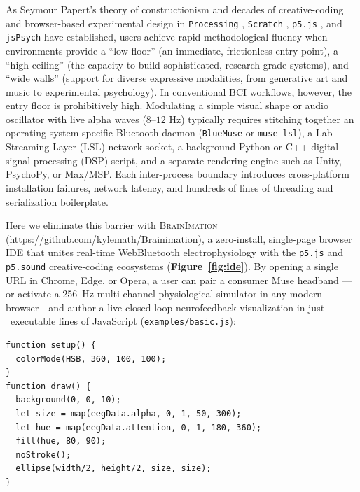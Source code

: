 \documentclass[10pt,twocolumn]{article}
\begin{document}
As Seymour Papert's theory of constructionism \citep{papert1980mindstorms} and decades of creative-coding and browser-based experimental design in \texttt{Processing} \citep{reas2007processing}, \texttt{Scratch} \citep{resnick2009scratch}, \texttt{p5.js} \citep{mccarthy2015p5}, and \texttt{jsPsych} \citep{deleeuw2015jspsych} have established, users achieve rapid methodological fluency when environments provide a ``low floor'' (an immediate, frictionless entry point), a ``high ceiling'' (the capacity to build sophisticated, research-grade systems), and ``wide walls'' (support for diverse expressive modalities, from generative art and music to experimental psychology). In conventional BCI workflows, however, the entry floor is prohibitively high. Modulating a simple visual shape or audio oscillator with live alpha waves ($8\text{--}12\text{ Hz}$) typically requires stitching together an operating-system-specific Bluetooth daemon (\texttt{BlueMuse} or \texttt{muse-lsl}), a Lab Streaming Layer (LSL) network socket, a background Python or C++ digital signal processing (DSP) script, and a separate rendering engine such as Unity, PsychoPy, or Max/MSP. Each inter-process boundary introduces cross-platform installation failures, network latency, and hundreds of lines of threading and serialization boilerplate.

Here we eliminate this barrier with \textsc{BrainImation} (\url{https://github.com/kylemath/Brainimation}), a zero-install, single-page browser IDE that unites real-time WebBluetooth electrophysiology with the \texttt{p5.js} and \texttt{p5.sound} creative-coding ecosystems \citep{mccarthy2015p5} (\textbf{Figure~\ref{fig:ide}}). By opening a single URL in Chrome, Edge, or Opera, a user can pair a consumer Muse headband \citep{krigolson2017choosing,kuziek2017transitioning,kuziek2018increasing}---or activate a 256~Hz multi-channel physiological simulator in any modern browser---and author a live closed-loop neurofeedback visualization in just \ExLOCMin~executable lines of JavaScript (\texttt{examples/basic.js}):

\noindent\begin{minipage}{\columnwidth}
\begin{lstlisting}
function setup() {
  colorMode(HSB, 360, 100, 100);
}
function draw() {
  background(0, 0, 10);
  let size = map(eegData.alpha, 0, 1, 50, 300);
  let hue = map(eegData.attention, 0, 1, 180, 360);
  fill(hue, 80, 90);
  noStroke();
  ellipse(width/2, height/2, size, size);
}
\end{lstlisting}
\end{minipage}
\vspace{4pt}
\end{document}
